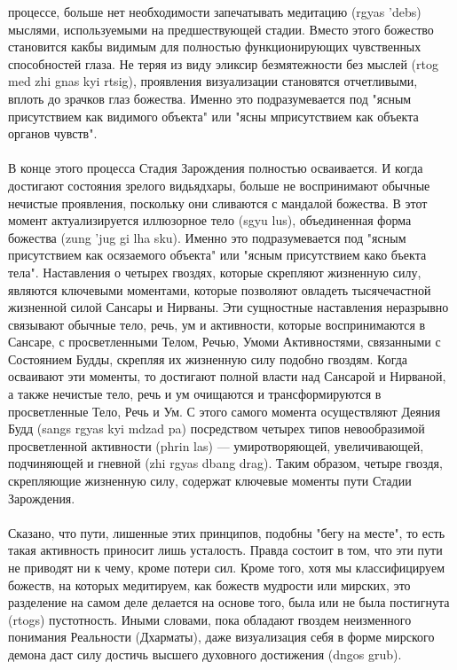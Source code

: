 \begin{siderules}
процессе, больше нет необходимости запечатывать медитацию (rgyas 'debs) мыслями,
используемыми на предшествующей стадии. Вместо этого божество становится какбы
видимым для полностью функционирующих чувственных способностей глаза. Не теряя из
виду эликсир безмятежности без мыслей (rtog med zhi gnas kyi rtsig), проявления
визуализации становятся отчетливыми, вплоть до зрачков глаз божества. Именно это
подразумевается под "ясным присутствием как видимого объекта" или "ясны мприсутствием
как объекта органов чувств".\\
\\
В конце этого процесса Стадия Зарождения полностью осваивается. И когда достигают
состояния зрелого видьядхары, больше не воспринимают обычные нечистые проявления,
поскольку они сливаются с мандалой божества. В этот момент актуализируется иллюзорное
тело (sgyu lus), объединенная форма божества (zung 'jug gi lha sku). Именно это
подразумевается под "ясным присутствием как осязаемого объекта" или "ясным присутствием како бъекта тела".
Наставления о четырех гвоздях, которые скрепляют жизненную силу, являются ключевыми
моментами, которые позволяют овладеть тысячечастной жизненной силой Сансары и
Нирваны. Эти сущностные наставления неразрывно связывают обычные тело, речь, ум и
активности, которые воспринимаются в Сансаре, с просветленными Телом, Речью, Умоми
Активностями, связанными с Состоянием Будды, скрепляя их жизненную силу подобно
гвоздям. Когда осваивают эти моменты, то достигают полной власти над Сансарой и
Нирваной, а также нечистые тело, речь и ум очищаются и трансформируются в
просветленные Тело, Речь и Ум. С этого самого момента осуществляют Деяния Будд (sangs
rgyas kyi mdzad pa) посредством четырех типов невообразимой просветленной активности
(phrin las) — умиротворяющей, увеличивающей, подчиняющей и гневной (zhi rgyas dbang
drag). Таким образом, четыре гвоздя, скрепляющие жизненную силу, содержат ключевые
моменты пути Стадии Зарождения.\\
\\
Сказано, что пути, лишенные этих принципов, подобны "бегу на месте", то есть такая
активность приносит лишь усталость. Правда состоит в том, что эти пути не приводят ни к
чему, кроме потери сил. Кроме того, хотя мы классифицируем божеств, на которых
медитируем, как божеств мудрости или мирских, это разделение на самом деле делается на
основе того, была или не была постигнута (rtogs) пустотность. Иными словами, пока
обладают гвоздем неизменного понимания Реальности (Дхарматы), даже визуализация себя в
форме мирского демона даст силу достичь высшего духовного достижения (dngos grub).

\end{siderules}
